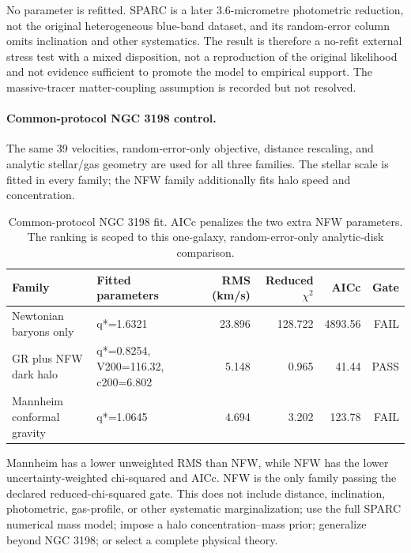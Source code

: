 No parameter is refitted.  SPARC is a later 3.6-micrometre photometric reduction, not the original heterogeneous blue-band dataset, and its random-error column omits inclination and other systematics.  The result is therefore a no-refit external stress test with a mixed disposition, not a reproduction of the original likelihood and not evidence sufficient to promote the model to empirical support.  The massive-tracer matter-coupling assumption is recorded but not resolved.

\paragraph{Common-protocol NGC 3198 control.}
The same 39 velocities, random-error-only objective, distance rescaling, and analytic stellar/gas geometry are used for all three families.  The stellar scale is fitted in every family; the NFW family additionally fits halo speed and concentration.

\begin{table}[htbp]
\centering
\scriptsize
\begin{tabularx}{\textwidth}{@{}Yp{0.25\textwidth}rrrr@{}}
\toprule
Family & Fitted parameters & RMS (km/s) & Reduced $\chi^2$ & AICc & Gate \\
\midrule
Newtonian baryons only & q*=1.6321 & 23.896 & 128.722 & 4893.56 & FAIL \\
GR plus NFW dark halo & q*=0.8254, V200=116.32, c200=6.802 & 5.148 & 0.965 & 41.44 & PASS \\
Mannheim conformal gravity & q*=1.0645 & 4.694 & 3.202 & 123.78 & FAIL \\
\bottomrule
\end{tabularx}
\caption{Common-protocol NGC 3198 fit.  AICc penalizes the two extra NFW parameters.  The ranking is scoped to this one-galaxy, random-error-only analytic-disk comparison.}
\label{tab:ngc3198-common-fit}
\end{table}

Mannheim has a lower unweighted RMS than NFW, while NFW has the lower uncertainty-weighted chi-squared and AICc.  NFW is the only family passing the declared reduced-chi-squared gate.  This does not include distance, inclination, photometric, gas-profile, or other systematic marginalization; use the full SPARC numerical mass model; impose a halo concentration--mass prior; generalize beyond NGC 3198; or select a complete physical theory.


